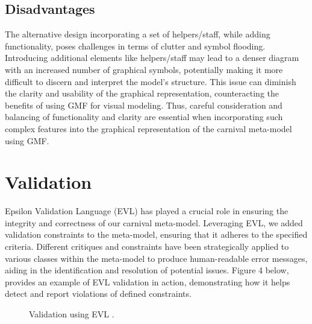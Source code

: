 \documentclass[a4paper,11pt]{report}
\begin{document}
\subsection{Disadvantages}

The alternative design incorporating a set of helpers/staff, while adding functionality, poses challenges in terms of clutter and symbol flooding. Introducing additional elements like helpers/staff may lead to a denser diagram with an increased number of graphical symbols, potentially making it more difficult to discern and interpret the model's structure. This issue can diminish the clarity and usability of the graphical representation, counteracting the benefits of using GMF for visual modeling. Thus, careful consideration and balancing of functionality and clarity are essential when incorporating such complex features into the graphical representation of the carnival meta-model using GMF.

\section{Validation}

Epsilon Validation Language (EVL) \cite{5} has played a crucial role in ensuring the integrity and correctness of our carnival meta-model. Leveraging EVL, we added validation constraints to the meta-model, ensuring that it adheres to the specified criteria. Different critiques and constraints have been strategically applied to various classes within the meta-model to produce human-readable error messages, aiding in the identification and resolution of potential issues. Figure 4 below, provides an example of EVL validation in action, demonstrating how it helps detect and report violations of defined constraints.

\begin{figure}[h]
\begin{center}
\caption{{\footnotesize Validation using EVL .}}
\label{Fig4}
	\end{center}
\end{figure}
\end{document}
